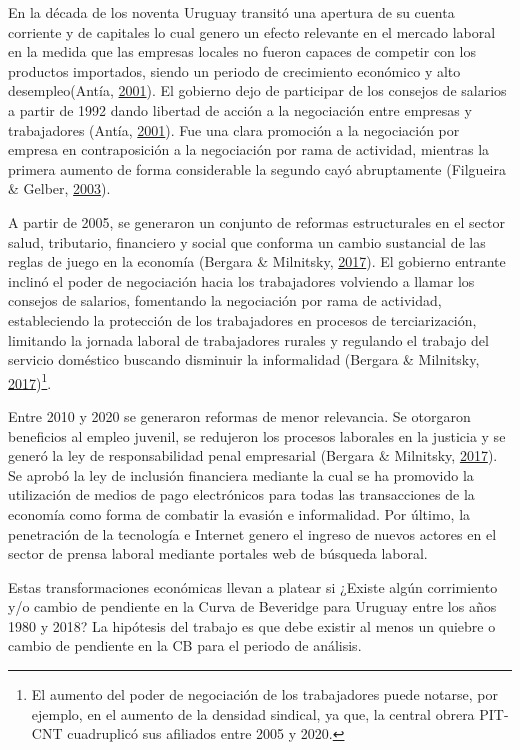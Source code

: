 \documentclass[12pt,oneside]{reedthesis}
\begin{document}
En la década de los noventa Uruguay transitó una apertura de su cuenta corriente y de capitales lo cual genero un efecto relevante en el mercado laboral en la medida que las empresas locales no fueron capaces de competir con los productos importados, siendo un periodo de crecimiento económico y alto desempleo(Antía, \protect\hyperlink{ref-Antia2001}{2001}). El gobierno dejo de participar de los consejos de salarios a partir de 1992 dando libertad de acción a la negociación entre empresas y trabajadores (Antía, \protect\hyperlink{ref-Antia2001}{2001}). Fue una clara promoción a la negociación por empresa en contraposición a la negociación por rama de actividad, mientras la primera aumento de forma considerable la segundo cayó abruptamente (Filgueira \& Gelber, \protect\hyperlink{ref-Filgueira2003}{2003}).

A partir de 2005, se generaron un conjunto de reformas estructurales en el sector salud, tributario, financiero y social que conforma un cambio sustancial de las reglas de juego en la economía (Bergara \& Milnitsky, \protect\hyperlink{ref-Bergara2017}{2017}). El gobierno entrante inclinó el poder de negociación hacia los trabajadores volviendo a llamar los consejos de salarios, fomentando la negociación por rama de actividad, estableciendo la protección de los trabajadores en procesos de terciarización, limitando la jornada laboral de trabajadores rurales y regulando el trabajo del servicio doméstico buscando disminuir la informalidad (Bergara \& Milnitsky, \protect\hyperlink{ref-Bergara2017}{2017})\footnote{El aumento del poder de negociación de los trabajadores puede notarse, por ejemplo, en el aumento de la densidad sindical, ya que, la central obrera PIT-CNT cuadruplicó sus afiliados entre 2005 y 2020.}.

Entre 2010 y 2020 se generaron reformas de menor relevancia. Se otorgaron beneficios al empleo juvenil, se redujeron los procesos laborales en la justicia y se generó la ley de responsabilidad penal empresarial (Bergara \& Milnitsky, \protect\hyperlink{ref-Bergara2017}{2017}). Se aprobó la ley de inclusión financiera mediante la cual se ha promovido la utilización de medios de pago electrónicos para todas las transacciones de la economía como forma de combatir la evasión e informalidad. Por último, la penetración de la tecnología e Internet genero el ingreso de nuevos actores en el sector de prensa laboral mediante portales web de búsqueda laboral.

Estas transformaciones económicas llevan a platear si ¿Existe algún corrimiento y/o cambio de pendiente en la Curva de Beveridge para Uruguay entre los años 1980 y 2018? La hipótesis del trabajo es que debe existir al menos un quiebre o cambio de pendiente en la CB para el periodo de análisis.
\end{document}
